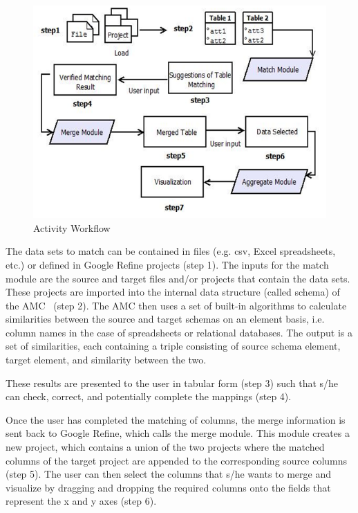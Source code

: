 \documentclass{../../Util/LaTEX/sig-alternate}
\begin{document}
\begin{figure}[ht!]
  \centering
    \includegraphics[scale=0.4]{architecture-2.png}
  \caption{Activity Workflow}
  \label{fig:Activity_workflow}
\end{figure}

The data sets to match can be contained in files (e.g. csv, Excel spreadsheets, etc.) or defined in Google Refine projects (step 1). The inputs for the match module are the source and target files and/or projects that contain the data sets. These projects are imported into the internal data structure (called schema) of the AMC~\cite{5767940} (step 2). The AMC then uses a set of built-in algorithms to calculate similarities between the source and target schemas on an element basis, i.e. column names in the case of spreadsheets or relational databases. The output is a set of similarities, each containing a triple consisting of source schema element, target element, and similarity between the two.

These results are presented to the user in tabular form (step 3) such that s/he can check, correct, and potentially complete the mappings (step 4).

Once the user has completed the matching of columns, the merge information is sent back to Google Refine, which calls the merge module. This module creates a new project, which contains a union of the two projects where the matched columns of the target project are appended to the corresponding source columns (step 5). The user can then select the columns that s/he wants to merge and visualize by dragging and dropping the required columns onto the fields that represent the x and y axes (step 6).
\end{document}
